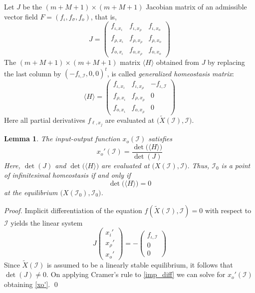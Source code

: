 \documentclass[a4paper,fleqn]{cas-dc}
\newtheorem{lemma}[theorem]{Lemma}
\begin{document}
Let $J$ be the $(m+M+1)\times (m+M+1)$ Jacobian matrix of an admissible vector field $F=(f_{\iota},f_{\sigma},f_{o})$, that is,
\begin{equation} \label{jacobian_multiple}
J = \begin{pmatrix}
  f_{\iota, x_\iota}   &  f_{\iota, x_\rho} & f_{\iota, x_o} \\
  f_{\rho, x_\iota}   &  f_{\rho, x_\rho} & f_{\rho, x_o} \\
  f_{o, x_\iota} &  f_{o, x_\rho} & f_{o, x_o} 
\end{pmatrix}
\end{equation}
The $(m+M+1)\times (m+M+1)$ matrix $\langle H \rangle$ obtained from $J$ by replacing the last column by $(-f_{\iota,\mathcal{I}},0,0)^t$, is called \emph{generalized homeostasis matrix}:
\begin{equation} \label{weighted_homeostasis_matrix_definition}
\langle H \rangle = 
\begin{pmatrix}
f_{\iota, x_\iota} &  f_{\iota, x_\rho} & -f_{\iota, \mathcal{I}} \\
f_{\rho, x_\iota}&  f_{\rho, x_\rho} & 0 \\
f_{o, x_\iota} &  f_{o, x_\rho} & 0
\end{pmatrix}
\end{equation}
Here all partial derivatives $f_{\ell,x_j}$ are evaluated at $\big(\tilde{X}(\mathcal{I}),\mathcal{I}\big)$.

\begin{lemma} \label{cramer_rule}
The input-output function $x_o(\mathcal{I})$ satisfies
\begin{equation} \label{xo'}
x_o'(\mathcal{I}) = \frac{\det\!\big(\langle H \rangle\big) }{\det(J)}
\end{equation}
Here, $\det(J)$ and $\det\!\big(\langle H \rangle\big)$ are evaluated at $\big(X(\mathcal{I}),\mathcal{I}\big)$. 
Thus, $\mathcal{I}_0$ is a point of infinitesimal homeostasis if and only if
\begin{equation} \label{xo'_reduced}
\det\!\big(\langle H \rangle\big) = 0
\end{equation}
at the equilibrium $\big(X(\mathcal{I}_0),\mathcal{I}_0\big)$.
\end{lemma}
\begin{proof}
Implicit differentiation of the equation $f(\tilde{X}(\mathcal{I}),\mathcal{I})=0$ with respect to $\mathcal{I}$ yields the linear system
\begin{equation} \label{imp_diff}
J \begin{pmatrix} x_i' \\ x_\rho' \\ x_o'\end{pmatrix} =
-\begin{pmatrix}f_{\iota, \mathcal{I}} \\ 0 \\ 0 \end{pmatrix}
\end{equation}
Since $\tilde{X}(\mathcal{I})$ is assumed to be a linearly stable equilibrium, it follows that $\det(J)\neq 0$. On applying Cramer's rule to \eqref{imp_diff} we can solve for $x_o'(\mathcal{I})$ obtaining \eqref{xo'}.
\qed
\end{proof}
\end{document}
